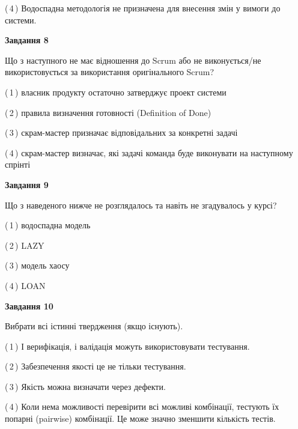 \documentclass[10pt, ukrainian]{article}
\begin{document}
{\begin {large}
(\,4\,) Водоспадна методологія не призначена для внесення змін у вимоги до системи. %


{\begin {center}\textbf{Завдання 8}\end {center}}\par
Що з наступного не має відношення до Scrum або не виконується/не використовується за використання оригінального Scrum?\par
\vspace{2mm}



(\,1\,) власник продукту остаточно затверджує проект системи%



(\,2\,) правила визначення готовності (Definition of Done) %



(\,3\,) скрам-мастер призначає відповідальних за конкретні задачі%



(\,4\,) скрам-мастер визначає, які задачі команда буде виконувати на наступному спрінті%


{\begin {center}\textbf{Завдання 9}\end {center}}\par
Що з наведеного нижче не розглядалось та навіть не згадувалось у курсі?\par
\vspace{2mm}



(\,1\,) водоспадна модель%



(\,2\,) LAZY%



(\,3\,) модель хаосу%



(\,4\,) LOAN%


{\begin {center}\textbf{Завдання 10}\end {center}}\par
Вибрати всі істинні твердження (якщо існують).\par
\vspace{2mm}



(\,1\,) І верифікація, і валідація можуть використовувати тестування.%



(\,2\,) Забезпечення якості це не тільки тестування.%



(\,3\,) Якість можна визначати через дефекти.%



(\,4\,) Коли нема можливості перевірити всі можливі комбінації, тестують їх попарні (pairwise) комбінації. Це може значно зменшити кількість тестів.%



\end {large}}
\end{document}
